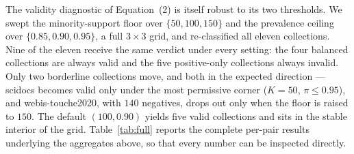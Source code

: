 \documentclass[sigconf,nonacm]{acmart}
\begin{document}
The validity diagnostic of Equation~(2) is itself robust to its two thresholds. We
swept the minority-support floor over $\{50, 100, 150\}$ and the prevalence ceiling
over $\{0.85, 0.90, 0.95\}$, a full $3\times3$ grid, and re-classified all eleven
collections. Nine of the eleven receive the same verdict under every setting: the four
balanced collections are always valid and the five positive-only collections always
invalid. Only two borderline collections move, and both in the expected direction ---
scidocs becomes valid only under the most permissive corner ($K{=}50$, $\pi\le0.95$),
and webis-touche2020, with $140$ negatives, drops out only when the floor is raised to
$150$. The default $(100, 0.90)$ yields five valid collections and sits in the stable
interior of the grid. Table~\ref{tab:full} reports the complete per-pair results
underlying the aggregates above, so that every number can be inspected directly.
\end{document}
